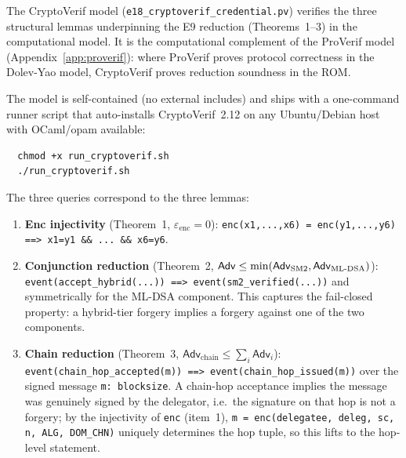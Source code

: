\documentclass[10pt,twocolumn]{IEEEtran}
\begin{document}
\begin{appendices}
The CryptoVerif model (\texttt{e18\_cryptoverif\_\allowbreak credential.pv}) verifies
the three structural lemmas underpinning the E9 reduction
(Theorems~1--3) in the computational model. It is the computational
complement of the ProVerif model (Appendix~\ref{app:proverif}):
where ProVerif proves protocol correctness in the Dolev-Yao model,
CryptoVerif proves reduction soundness in the ROM.

The model is self-contained (no external includes) and ships with a
one-command runner script that auto-installs CryptoVerif~2.12 on any
Ubuntu/Debian host with OCaml/opam available:

\begin{verbatim}
  chmod +x run_cryptoverif.sh
  ./run_cryptoverif.sh
\end{verbatim}

The three queries correspond to the three lemmas:

\begin{enumerate}
  \item \textbf{Enc injectivity} (Theorem~1, $\varepsilon_{\text{enc}}=0$):
    \texttt{enc(x1,...,x6) = enc(y1,...,y6) ==> x1=y1 \&\& ... \&\& x6=y6}.
  \item \textbf{Conjunction reduction} (Theorem~2,
    $\mathsf{Adv} \leq \min(\mathsf{Adv}_{\text{SM2}},\mathsf{Adv}_{\text{ML\text{-}DSA}})$):
    \texttt{event(accept\_hybrid(...)) ==> event(sm2\_verified(...))} and
    symmetrically for the ML-DSA component. This captures the fail-closed
    property: a hybrid-tier forgery implies a forgery against one of the
    two components.
  \item \textbf{Chain reduction} (Theorem~3,
    $\mathsf{Adv}_{\text{chain}} \leq \sum_i \mathsf{Adv}_i$):
    \texttt{event(chain\_hop\_accepted(m)) ==> event(chain\_hop\_issued(m))}
    over the signed message \texttt{m: blocksize}. A chain-hop acceptance
    implies the message was genuinely signed by the delegator, i.e.\ the
    signature on that hop is not a forgery; by the injectivity of
    \texttt{enc} (item~1), \texttt{m = enc(delegatee, deleg, sc, n, ALG, DOM\_CHN)}
    uniquely determines the hop tuple, so this lifts to the hop-level
    statement.
\end{enumerate}


\end{appendices}
\end{document}
